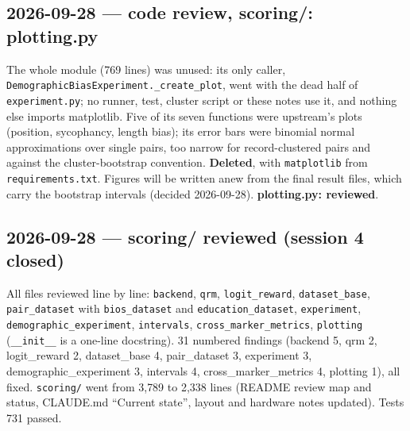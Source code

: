 \documentclass{article}
\begin{document}
\subsection*{2026-09-28 --- code review, scoring/: plotting.py}
The whole module (769 lines) was unused: its only caller, \texttt{DemographicBiasExperiment.\_create\_plot}, went
with the dead half of \texttt{experiment.py}; no runner, test, cluster script or these notes use it, and nothing
else imports matplotlib. Five of its seven functions were upstream's plots (position, sycophancy, length bias);
its error bars were binomial normal approximations over single pairs, too narrow for record-clustered pairs and
against the cluster-bootstrap convention. \textbf{Deleted}, with \texttt{matplotlib} from
\texttt{requirements.txt}. Figures will be written anew from the final result files, which carry the bootstrap
intervals (decided 2026-09-28). \textbf{plotting.py: reviewed}.

\subsection*{2026-09-28 --- scoring/ reviewed (session 4 closed)}
All files reviewed line by line: \texttt{backend}, \texttt{qrm}, \texttt{logit\_reward}, \texttt{dataset\_base},
\texttt{pair\_dataset} with \texttt{bios\_dataset} and \texttt{education\_dataset}, \texttt{experiment},
\texttt{demographic\_experiment}, \texttt{intervals}, \texttt{cross\_marker\_metrics}, \texttt{plotting}
(\texttt{\_\_init\_\_} is a one-line docstring). 31 numbered findings (backend 5, qrm 2, logit\_reward 2,
dataset\_base 4, pair\_dataset 3, experiment 3, demographic\_experiment 3, intervals 4, cross\_marker\_metrics 4,
plotting 1), all fixed. \texttt{scoring/} went from 3{,}789 to 2{,}338 lines (README review map and status,
CLAUDE.md ``Current state'', layout and hardware notes updated). Tests 731 passed.
\end{document}
